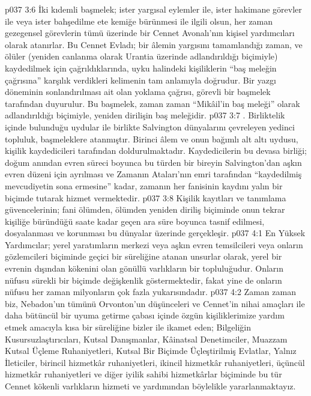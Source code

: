 \vs p037 3:6 İki kıdemli başmelek; ister yargısal eylemler ile, ister hakimane görevler ile veya ister bahşedilme ete kemiğe bürünmesi ile ilgili olsun, her zaman gezegensel görevlerin tümü üzerinde bir Cennet Avonalı’nın kişisel yardımcıları olarak atanırlar. Bu Cennet Evladı; bir âlemin yargısını tamamlandığı zaman, ve ölüler (yeniden canlanma olarak Urantia üzerinde adlandırıldığı biçimiyle) kaydedilmek için çağrıldıklarında, uyku halindeki kişiliklerin “baş meleğin çağrısına” karşılık verdikleri kelimenin tam anlamıyla doğrudur. Bir yazgı döneminin sonlandırılması ait olan yoklama çağrısı, görevli bir başmelek tarafından duyurulur. Bu başmelek, zaman zaman “Mikâil’in baş meleği” olarak adlandırıldığı biçimiyle, yeniden dirilişin baş meleğidir.
\vs p037 3:7 . Birliktelik içinde bulunduğu uydular ile birlikte Salvington dünyalarını çevreleyen yedinci topluluk, başmeleklere atanmıştır. Birinci âlem ve onun bağımlı alt altı uydusu, kişilik kaydedicileri tarafından doldurulmaktadır. Kaydedicilerin bu devasa birliği; doğum anından evren süreci boyunca bu türden bir bireyin Salvington’dan aşkın evren düzeni için ayrılması ve Zamanın Ataları’nın emri tarafından “kaydedilmiş mevcudiyetin sona ermesine” kadar, zamanın her fanisinin kaydını yalın bir biçimde tutarak hizmet vermektedir.
\vs p037 3:8 Kişilik kayıtları ve tanımlama güvencelerinin; fani ölümden, ölümden yeniden diriliş biçiminde onun tekrar kişiliğe büründüğü saate kadar geçen ara süre boyunca tasnif edilmesi, dosyalanması ve korunması bu dünyalar üzerinde gerçekleşir.
\vs p037 4:1 En Yüksek Yardımcılar; yerel yaratımların merkezi veya aşkın evren temsilcileri veya onların gözlemcileri biçiminde geçici bir süreliğine atanan unsurlar olarak, yerel bir evrenin dışından kökenini olan gönüllü varlıkların bir topluluğudur. Onların nüfusu sürekli bir biçimde değişkenlik göstermektedir, fakat yine de onların nüfusu her zaman milyonların çok fazla yukarısındadır.
\vs p037 4:2 Zaman zaman biz, Nebadon’un tümünü Orvonton’un düşünceleri ve Cennet’in nihai amaçları ile daha bütüncül bir uyuma getirme çabası içinde özgün kişiliklerimize yardım etmek amacıyla kısa bir süreliğine bizler ile ikamet eden; Bilgeliğin Kusursuzlaştırıcıları, Kutsal Danışmanlar, Kâinatsal Denetimciler, Muazzam Kutsal Üçleme Ruhaniyetleri, Kutsal Bir Biçimde Üçleştirilmiş Evlatlar, Yalnız İleticiler, birincil hizmetkâr ruhaniyetleri, ikincil hizmetkâr ruhaniyetleri, üçüncül hizmetkâr ruhaniyetleri ve diğer iyilik sahibi hizmetkârlar biçiminde bu tür Cennet kökenli varlıkların hizmeti ve yardımından böylelikle yararlanmaktayız.
